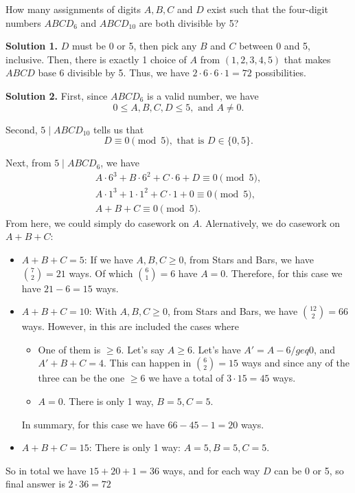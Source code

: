 \documentclass[11pt,twoside]{scrartcl}
\begin{document}
\begin{problem}
    How many assignments of digits $ A, B, C $ and $ D $ exist such that the four-digit numbers $ ABCD_6 $ and $ ABCD_{10} $ are both divisible by 5?
    \begin{sketch}
        \textbf{Solution 1. }
        $D$ must be 0 or 5, then pick any $B$ and $C$ between 0 and 5, inclusive. Then, there is exactly 1 choice of $A$ from $(1, 2, 3, 4, 5)$ that makes $ABCD$ base 6 divisible by 5. Thus, we have $2\cdot6\cdot6\cdot1=\boxed{72}$ possibilities. 

        \textbf{Solution 2. }
        First, since $ABCD_6$ is a valid number, we have $$ 0 \leq A,B,C,D \leq 5, \text{ and } A \not = 0.$$

        Second, $5 \mid ABCD_{10}$ tells us that $$D \equiv 0\pmod 5, \text{ that is } D \in \{0, 5\}.$$

        Next, from $5 \mid ABCD_{6}$, we have 
        \begin{align*}
            A \cdot 6^3 + B \cdot 6^2 + C \cdot 6 + D \equiv 0\pmod 5, \\
            A \cdot 1^3 + 1 \cdot 1^2 + C \cdot 1 + 0 \equiv 0\pmod 5, \\
            A + B + C \equiv 0 \pmod 5. 
        \end{align*} 
        From here, we could simply do casework on $A$. Alernatively, we do casework on $A+B+C$:
        \begin{itemize}
            \item $A+B+C=5$: If we have $A, B, C \geq 0$, from Stars and Bars, we have $\binom{7}{2} = 21$ ways. Of which $\binom{6}{1} =6$ have $A=0$. Therefore, for this case we have $21-6 = 15$ ways.
            \item $A+B+C=10$: With $A, B, C \geq 0$, from Stars and Bars, we have $\binom{12}{2} = 66$ ways. However, in this are included the cases where 
            \begin{itemize}
                \item One of them is $ \geq 6$. Let's say $A \geq 6$. Let's have $A' = A - 6 /geq 0$, and $A' + B + C = 4$. This can happen in $\binom{6}{2} = 15$ ways and since any of the three can be the one $ \geq 6$ we have a total of $3\cdot15 = 45$ ways.
                \item $A = 0$. There is only 1 way, $B=5, C=5$. 
            \end{itemize}
            In summary, for this case we have $66 - 45 - 1 = 20$ ways.
            \item $A+B+C=15$: There is only 1 way: $A=5, B=5, C=5$.
        \end{itemize}
        So in total we have $15 + 20 + 1 = 36$ ways, and for each way $D$ can be 0 or 5, so final answer is $2 \cdot 36 = \boxed{72}$
    \end{sketch}
\end{problem}
\end{document}
